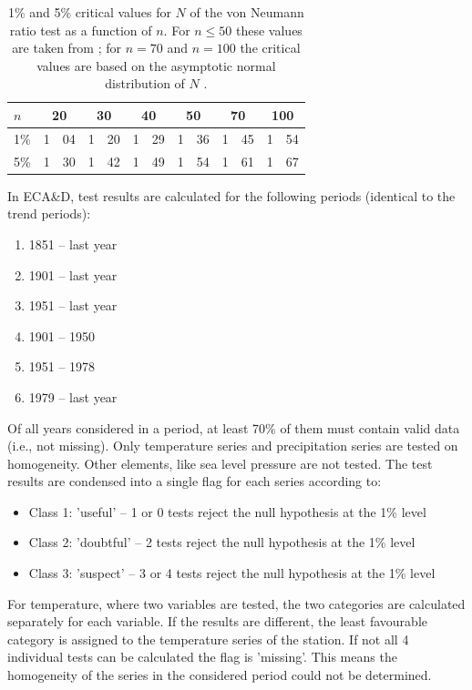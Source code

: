 \documentclass[a4paper,11pt]{article}
\begin{document}
\begin{table}[!ht]
\begin{center}
\caption{1\% and 5\% critical values for $N$ of the von Neumann ratio
test as a function of $n$. For $n \leq 50$ these values are taken from
\citet{owen}; for $n=70$ and $n=100$ the critical values are based on
the asymptotic normal distribution of $N$ \citep{buishand1981}.}
\label{tab:vonneumann}
\begin{tabular}{l r@{.}l r@{.}l r@{.}l r@{.}l r@{.}l r@{.}l}
\hline
$n$ & \multicolumn{2}{c}{20} & \multicolumn{2}{c}{30} & \multicolumn{2}{c}{40} & \multicolumn{2}{c}{50} & \multicolumn{2}{c}{70} & \multicolumn{2}{c}{100}\\
\hline
1\% & 1&04 & 1&20 & 1&29 & 1&36 & 1&45 & 1&54 \\
5\% & 1&30 & 1&42 & 1&49 & 1&54 & 1&61 & 1&67 \\
\end{tabular}
\end{center}
\end{table}


In ECA\&D, test results are calculated for the following periods
(identical to the trend periods):
\begin{enumerate}
\item 1851 -- last year
\item 1901 -- last year 
\item 1951 -- last year
\item 1901 -- 1950 
\item 1951 -- 1978
\item 1979 -- last year
\end{enumerate}
Of all years considered in a period, at least 70\% of them must
contain valid data (i.e., not missing). Only temperature series and
precipitation series are tested on homogeneity. Other elements, like
sea level pressure are not tested. The test results are condensed
into a single flag for each series according to:
\begin{itemize}
\item Class 1: 'useful' -- 1 or 0 tests reject the null hypothesis at
the 1\% level 
\item Class 2: 'doubtful' -- 2 tests reject the null hypothesis at the
1\% level
\item Class 3: 'suspect' -- 3 or 4 tests reject the null hypothesis at
the 1\% level
\end{itemize}

For temperature, where two variables are tested, the two categories
are calculated separately for each variable. If the results are
different, the least favourable category is assigned to the
temperature series of the station. If not all 4 individual tests can
be calculated the flag is 'missing'. This means the homogeneity of the
series in the considered period could not be determined.
\end{document}
